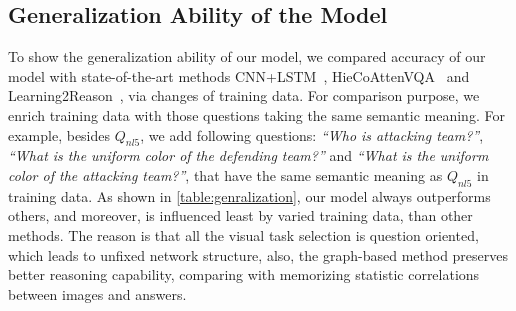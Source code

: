 

\subsection{Generalization Ability of the Model}

To show the generalization ability of our model, we compared accuracy of our model with state-of-the-art methods CNN+LSTM~\cite{VQA}, HieCoAttenVQA~\cite{Lu2016Hie} and Learning2Reason~\cite{hu2017learning}, via changes of training data. For comparison purpose, we enrich training data with those questions taking the same semantic meaning. For example, besides $Q_{nl5}$, we add following questions: \textit{``Who is attacking team?''}, \textit{``What is the uniform color of the defending team?''} and \textit{``What is the uniform color of the attacking team?''}, that have the same semantic meaning as $Q_{nl5}$ in training data. As shown in \cref{table:genralization}, our model always outperforms others, and moreover, is influenced least by varied training data, than other methods. The reason is that all the visual task selection is question oriented, which leads to unfixed network structure, also, the graph-based method preserves better reasoning capability, comparing with memorizing statistic correlations between images and answers.



